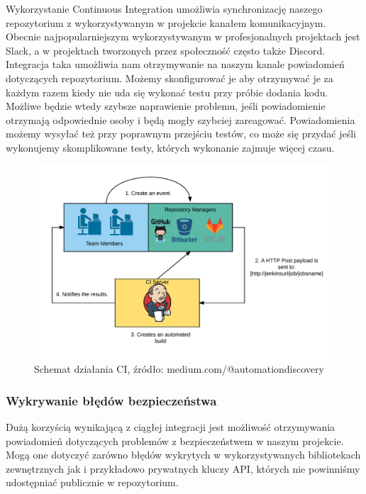 \begin{itemize}
    Wykorzystanie Continuous Integration umożliwia synchronizację naszego repozytorium z wykorzystywanym w projekcie kanałem komunikacyjnym. Obecnie najpopularniejszym wykorzystywanym w profesjonalnych projektach jest Slack, a w projektach tworzonych przez społeczność często także Discord. Integracja taka umożliwia nam otrzymywanie na naszym kanale powiadomień dotyczących repozytorium. Możemy skonfigurować je aby otrzymywać je za każdym razem kiedy nie uda się wykonać testu przy próbie dodania kodu. Możliwe będzie wtedy szybsze naprawienie problemu, jeśli powiadomienie otrzymają odpowiednie osoby i będą mogły szybciej zareagować. Powiadomienia możemy wysyłać też przy poprawnym przejściu testów, co może się przydać jeśli wykonujemy skomplikowane testy, których wykonanie zajmuje więcej czasu. 
\end{itemize}

\begin{figure}[htbp]
    \centering
    \includegraphics[width=13cm]{images/ci_flow.png}
    \caption{Schemat działania CI, źródło: medium.com/@automationdiscovery}
    \label{fig:ciflow}
\end{figure}

\subsubsection{Wykrywanie błędów bezpieczeństwa}
Dużą korzyścią wynikającą z ciągłej integracji jest możliwość otrzymywania powiadomień dotyczących problemów z bezpieczeństwem w naszym projekcie. Mogą one dotyczyć zarówno błędów wykrytych w wykorzystywanych bibliotekach zewnętrznych jak i przykładowo prywatnych kluczy API, których nie powinniśmy udostępniać publicznie w repozytorium. 


